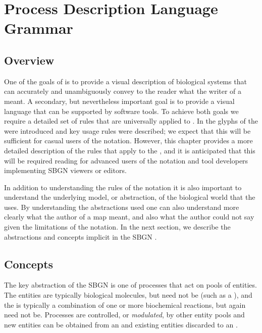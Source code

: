 \chapter{Process Description Language Grammar}
\label{chp:grammar}

\section{Overview}

One of the goals of \SBGNPDLone is to provide a visual description of biological systems that can accurately and unambiguously  convey to the reader what the writer of a \PDm meant. A secondary, but nevertheless important goal is to provide a visual language that can be supported by software tools. To achieve both goals we require a detailed set of rules that are universally applied to \PDms. In  the glyphs of the \PDl were introduced and key usage rules were described; we expect that this will be sufficient for casual users of the notation. However, this chapter provides a more detailed description of the rules that apply to the \PDl, and it is anticipated that this will be required reading for advanced users of the notation and tool developers implementing SBGN \PD viewers or editors.

In addition to understanding the rules of the notation it is also important to understand the underlying model, or abstraction, of the biological world that the \PDl uses. By understanding the abstractions used one can also understand more clearly what the author of a map meant, and also what the author could not say given the limitations of the notation. In the next section, we describe the abstractions and concepts implicit in the SBGN \PDl.

\section{Concepts}
\label{sec:concepts}

The key abstraction of the SBGN \PDl is one of  processes that act on pools of entities. The entities are typically biological molecules, but need not be (such as a ), and the  is typically a combination of one or more  biochemical reactions, but again need not be.
Processes are controlled, or \emph{modulated}, by other entity pools and new entities can be obtained from an  and existing entities discarded to an .


